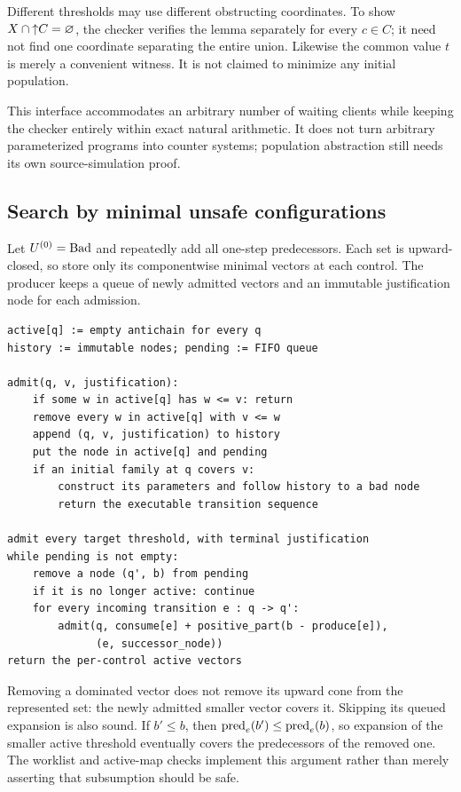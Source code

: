 Different thresholds may use different obstructing coordinates. To show
$X\cap\mathord{\uparrow}C=\varnothing$, the checker verifies the lemma separately for every
$c\in C$; it need not find one coordinate separating the entire union.
Likewise the common value $t$ is merely a convenient witness. It is not claimed
to minimize any initial population.

This interface accommodates an arbitrary number of waiting clients while
keeping the checker entirely within exact natural arithmetic. It does not turn
arbitrary parameterized programs into counter systems; population abstraction
still needs its own source-simulation proof.

\subsection{Search by minimal unsafe configurations}
Let $U^{(0)}=\operatorname{Bad}$ and repeatedly add all one-step predecessors. Each set is
upward-closed, so store only its componentwise minimal vectors at each control.
The producer keeps a queue of newly admitted vectors and an immutable
justification node for each admission.

\begin{lstlisting}
active[q] := empty antichain for every q
history := immutable nodes; pending := FIFO queue

admit(q, v, justification):
    if some w in active[q] has w <= v: return
    remove every w in active[q] with v <= w
    append (q, v, justification) to history
    put the node in active[q] and pending
    if an initial family at q covers v:
        construct its parameters and follow history to a bad node
        return the executable transition sequence

admit every target threshold, with terminal justification
while pending is not empty:
    remove a node (q', b) from pending
    if it is no longer active: continue
    for every incoming transition e : q -> q':
        admit(q, consume[e] + positive_part(b - produce[e]),
              (e, successor_node))
return the per-control active vectors
\end{lstlisting}

Removing a dominated vector does not remove its upward cone from the represented
set: the newly admitted smaller vector covers it. Skipping its queued expansion
is also sound. If $b'\le b$, then $\operatorname{pred}_e(b')\le\operatorname{pred}_e(b)$, so expansion
of the smaller active threshold eventually covers the predecessors of the
removed one. The worklist and active-map checks implement this argument rather
than merely asserting that subsumption should be safe.

